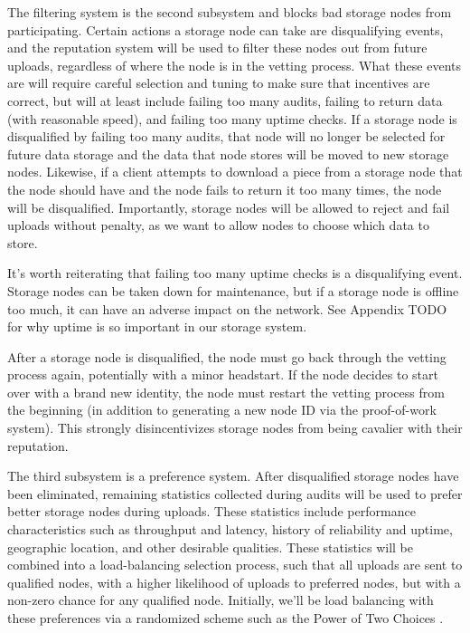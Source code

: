 \documentclass[a4paper,10pt]{article} \usepackage[utf8]{inputenc}
\newcommand{\todo}[1]{{\color{red} TODO #1 }}
\begin{document}
The filtering system is the second subsystem and blocks bad storage nodes from
participating.
Certain actions a storage node can take are disqualifying events, and the
reputation system will be used to filter these nodes out from future uploads,
regardless of where the node is in the vetting process.
What these events are will require careful selection and tuning to make sure
that incentives are correct, but will at least include failing too many audits,
failing to return data (with reasonable speed), and failing too many uptime
checks.
If a storage node is disqualified by failing too many audits, that node will no
longer be selected for future data storage and the data that node stores will
be moved to new storage nodes.
Likewise, if a client attempts to download a piece from a storage node that
the node should have and the node fails to return it too many times, the
node will be disqualified. Importantly, storage nodes will be allowed to reject
and fail uploads without penalty, as we want to allow nodes to choose which data
to store.

It's worth reiterating that failing too many uptime checks is a disqualifying
event. Storage nodes can be taken down for maintenance, but if a storage node
is offline too much, it can have an adverse impact on the network. See Appendix
\todo{} for why uptime is so important in our storage system.

After a storage node is disqualified, the node must go back through the vetting
process again, potentially with a minor headstart. If the node decides to start
over with a brand new identity, the node must restart the vetting process from
the beginning (in addition to generating a new node ID via the proof-of-work
system). This strongly disincentivizes storage nodes from being cavalier with
their reputation.

The third subsystem is a preference system. After disqualified storage nodes
have been eliminated, remaining statistics collected during audits
will be used to prefer better storage nodes during uploads.
These statistics include performance characteristics such as throughput and
latency, history of reliability and uptime, geographic location, and other
desirable qualities.
These statistics will be combined into a load-balancing selection process, such
that all uploads are sent to qualified nodes, with a higher likelihood of
uploads to preferred nodes, but with a non-zero chance for any qualified node.
Initially, we'll be load balancing with these preferences via a randomized
scheme such as the Power of Two Choices \cite{power-of-two-choices}.
\end{document}
